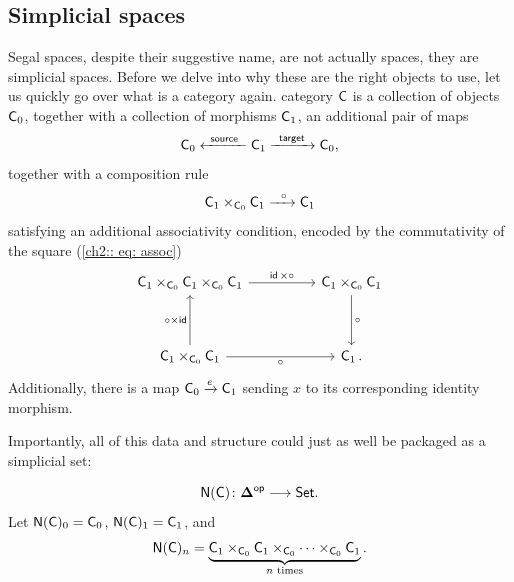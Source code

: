 \subsection{Simplicial spaces}

Segal spaces, despite their suggestive name, are not actually spaces, they are simplicial spaces. Before we delve into why these are the right objects to use, let us quickly go over what is a category again. category $\mathsf C$ is a collection of objects $\mathsf C_{0}$, together with a collection of morphisms $\mathsf C_{1}$, an additional pair of maps 
\begin{equation}
    \mathsf C_0 \xleftarrow{\,\,\,\mathsf{source}\,\,\,} \mathsf C_{1} \xrightarrow{\,\,\,\mathsf{target}\,\,\,} \mathsf C_{0},
\end{equation} 
together with a composition rule 
\begin{equation}
    \mathsf C_{1} \times_{\mathsf C_{0}} \mathsf C_{1} \xrightarrow{\,\,\ \circ \,\,} \mathsf C_{1} 
\end{equation}
satisfying an additional associativity condition, encoded by the commutativity of the square (\ref{ch2:: eq: assoc})
\begin{equation}\label{ch2:: eq: assoc}
    \begin{tikzcd}
        {\sC_1\times_{\sC_{0}} \sC_{1}\times_{\sC_{0}} \sC_{1}} && {\sC_1\times_{\sC_{0}} \sC_{1}} \\
        \\
        {\sC_1\times_{\sC_{0}} \sC_{1}} && {\sC_1}\, .
        \arrow["{ \id \times \circ}", from=1-1, to=1-3]
        \arrow["\circ", from=1-3, to=3-3]
        \arrow["{\circ \times \id}", from=3-1, to=1-1]
        \arrow["{ \circ}"', from=3-1, to=3-3]
    \end{tikzcd}
\end{equation}
Additionally, there is a map $\mathsf C_{0} \xrightarrow{e} \mathsf C_{1}$ sending $x$ to its corresponding identity morphism. 

Importantly, all of this data and structure could just as well be packaged as a simplicial set: 

\begin{equation}
    \mathsf N(\mathsf C) \colon \mathbf\Delta^{\mathsf{op}} \longrightarrow \mathsf{Set}.
\end{equation} 
Let $\mathsf N(\mathsf C)_0 = \mathsf C_0$, $\mathsf N(\mathsf C)_{1} = \mathsf C_1$, and 
\begin{equation}
\mathsf N(\mathsf C)_{n} = \underbrace{\mathsf C_{1} \times_{\mathsf C_{0}} \mathsf C_{1} \times_{\mathsf C_{0}} \cdots \times_{\mathsf C_{0}} \mathsf C_{1}}_{n \text{ times}}.
\end{equation} 

